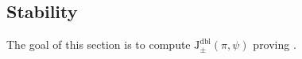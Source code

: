 \documentclass[12pt, reqno]{amsart}
\newtheorem{proposition}[theorem]{Proposition}
\theoremstyle{definition}
\theoremstyle{definition}
\theoremstyle{definition}
\newcommand{\hermitianSpace}{\mathrm{V}}
\newcommand{\fieldCharacter}{\psi}
\newcommand{\GroupExtension}[1]{\widetilde{#1}}
\newcommand{\Frobenius}{\operatorname{Fr}}
\newcommand{\dblJacobiSumScalar}[2]{\mathrm{J}_{\pm}^{\mathrm{dbl}}\left(#1, #2\right)}
\newcommand{\dblGammaFactorSpace}[4]{\Gamma^{\mathrm{dbl}}_{#1}\left(#2 \times #3, #4\right)}
\newcommand{\algebraicGroup}[1]{\boldsymbol{\mathrm{#1}}}
\newcommand{\LusztigSeries}[2]{\mathcal{E}\left(#1, (#2)\right)}
\newcommand{\DualFrobeniusFixedPoints}[2][\Frobenius^{\ast}]{\algebraicGroup{#2}^{\ast #1}}
\newcommand{\FrobeniusFixedPoints}[2][\Frobenius]{\algebraicGroup{#2}^{#1}}
\newcommand{\calvin}[1]{\textcolor{orange}{\sffamily ((CALVIN: #1))}}
\begin{document}
\begin{comment}
\begin{proposition}[{\cite[Page 172]{Lusztig1977}}]
	Let $\GroupExtension{G}$ have connected center. For any semisimple element $s \in \DualFrobeniusFixedPoints{\GroupExtension{G}}$, the Lusztig series $\LusztigSeries{\FrobeniusFixedPoints{\GroupExtension{G}}}{s}$ contains at most one cuspidal element.
\end{proposition}

While our groups $G$ may not have connected center, the function $\Phi(g)$ extends by zero to a class function on $\tilde{G}$ (see section 3.2) which does have connected center. Hence if a representation $\pi$ of $\tilde{G}$ deposes intorepresentations $\pi_1 \oplus \pi_2 \hdots \oplus \pi_r$ of $G$, $\dblGammaFactorSpace{\hermitianSpace}{\pi_1}{\chi}{\fieldCharacter} = \dblGammaFactorSpace{\hermitianSpace}{\pi_2}{\chi}{\fieldCharacter} =\hdots =\dblGammaFactorSpace{\hermitianSpace}{\pi_r}{\chi}{\fieldCharacter}$.

\begin{proposition}[{\cite[Proposition 11.7]{Bonnafe2006}}]
	Let $\tilde{s}$ be a semisimple element of $\DualFrobeniusFixedPoints{\GroupExtension{G}}$ and let $s = i^{\ast}\left(\tilde{s}\right)$. Then
	\begin{enumerate}
		\item If $\tilde{\pi} \in \LusztigSeries{\FrobeniusFixedPoints{\GroupExtension{G}}}{\tilde{s}}$ and if $\pi$ is an irreducible subrepresentation of the restriction of $\tilde{\pi}$ to $\FrobeniusFixedPoints{G}$, then $\pi \in \LusztigSeries{\FrobeniusFixedPoints{G}}{s}$.
		\item Let $\pi \in \LusztigSeries{\FrobeniusFixedPoints{G}}{s}$. Then there exists $\tilde{\pi} \in \LusztigSeries{\FrobeniusFixedPoints{\GroupExtension{G}}}{\tilde{s}}$ such that $\pi$ is an irreducible subrepresentation of the restriction of $\tilde{\pi}$ to $\FrobeniusFixedPoints{G}$.
	\end{enumerate}
\end{proposition}
\calvin{maybe say that cuspidal breaks into cuspidal pieces}
So all the cuspidal $\pi$ in a Lusztig packet $\LusztigSeries{G}{s}$ are irreducible pieces in the restriction from $\GroupExtension{G}$ to $G$ of a single cuspidal representation $\tilde{\pi}$ of $\GroupExtension{G}$.

\calvin{end alternate writeup}
\end{comment}

\subsection{Stability}\label{subsec:stability}
The goal of this section is to compute $\dblJacobiSumScalar{\pi}{\fieldCharacter}$ proving .
\end{document}
